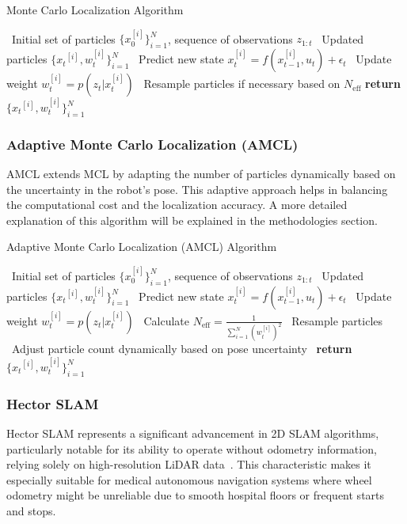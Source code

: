\begin{algorithm}
    \caption{Monte Carlo Localization Algorithm}\label{alg:mcl}
    \begin{algorithmic}[1]
    \REQUIRE~Initial set of particles $\{x_0^{[i]}{\}}_{i=1}^{N}$, sequence of observations $z_{1:t}$
    \ENSURE~Updated particles $\{{x_t}^{[i]}, w_t^{[i]}{\}}_{i=1}^{N}$
        \STATE~Predict new state $x_t^{[i]} = f(x_{t-1}^{[i]}, u_t) + \epsilon_t$
        \STATE~Update weight $w_t^{[i]} = p(z_t | x_t^{[i]})$        
    \ENDFOR\STATE~Resample particles if necessary based on $N_{\text{eff}}$
    \STATE\textbf{return} $\{{x_t}^{[i]}, w_t^{[i]}{\}}_{i=1}^{N}$
    \end{algorithmic}
\end{algorithm}



\subsubsection{Adaptive Monte Carlo Localization (AMCL)}
AMCL extends MCL by adapting the number of particles dynamically based on the uncertainty in the robot’s pose.
This adaptive approach helps in balancing the computational cost and the localization accuracy. A more detailed
explanation of this algorithm will be explained in the methodologies section.

\begin{algorithm}
    \caption{Adaptive Monte Carlo Localization (AMCL) Algorithm}\label{alg:amcl}
    \begin{algorithmic}[1]
    \REQUIRE~Initial set of particles $\{x_0^{[i]}{\}}_{i=1}^{N}$, sequence of observations $z_{1:t}$
    \ENSURE~Updated particles $\{{x_t}^{[i]}, w_t^{[i]}{\}}_{i=1}^{N}$
        \STATE~Predict new state $x_t^{[i]} = f(x_{t-1}^{[i]}, u_t) + \epsilon_t$
        \STATE~Update weight $w_t^{[i]} = p(z_t | x_t^{[i]})$
    \ENDFOR\STATE~Calculate $N_{\text{eff}} = \frac{1}{\sum_{i=1}^{N} {(w_t^{[i]})}^2}$
        \STATE~Resample particles
        \STATE~Adjust particle count dynamically based on pose uncertainty    
    \ENDIF\STATE~\textbf{return} $\{{x_t}^{[i]}, w_t^{[i]}{\}}_{i=1}^{N}$
    \end{algorithmic}
\end{algorithm}


\subsubsection{Hector SLAM}
Hector SLAM represents a significant advancement in 2D SLAM algorithms, particularly notable for
its ability to operate without odometry information, relying solely on high-resolution LiDAR data~\cite{nagla2020hector}. 
This characteristic makes it especially suitable for medical autonomous navigation systems where wheel odometry might be
unreliable due to smooth hospital floors or frequent starts and stops.

